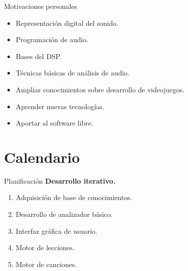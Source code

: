 \documentclass[11pt,xcolor=svgnames]{beamer}
\begin{document}
\begin{frame}{Motivaciones personales}
  \begin{itemize}
  \item Representación digital del sonido.
  \item Programación de audio.\pause

  \item Bases del DSP.
  \item Técnicas básicas de análisis de audio.\pause

  \item Ampliar conocimientos sobre desarrollo de videojuegos.
  \item Aprender nuevas tecnologías.
  \item Aportar al software libre.
  \end{itemize}
\end{frame}

\section{Calendario}

\begin{frame}{Planificación}
\textbf{Desarrollo iterativo.} \pause
\begin{enumerate}
\item Adquisición de base de conocimientos. \pause
\item Desarrollo de analizador básico. \pause
\item Interfaz gráfica de usuario. \pause
\item Motor de lecciones. \pause
\item Motor de canciones. \pause
\end{enumerate}
\end{frame}
\end{document}
